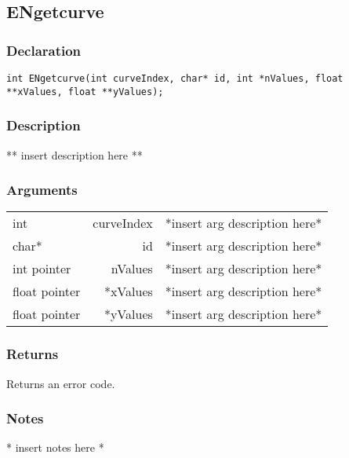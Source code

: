 \subsection{ENgetcurve}
\subsubsection{Declaration}
\begin{lstlisting}
int ENgetcurve(int curveIndex, char* id, int *nValues, float **xValues, float **yValues);
\end{lstlisting}
\subsubsection{Description}
** insert description here **
\subsubsection{Arguments}
\begin{tabular}{l r p{11cm} }
int&curveIndex&*insert arg description here* \\[6pt]
char*&id&*insert arg description here* \\[6pt]
int pointer&nValues&*insert arg description here* \\[6pt]
float pointer&*xValues&*insert arg description here* \\[6pt]
float pointer&*yValues&*insert arg description here* \\[6pt]
\end{tabular}
\subsubsection{Returns}
Returns an error code.
\subsubsection{Notes}
* insert notes here *